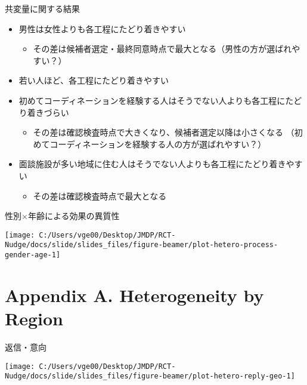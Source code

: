 \documentclass[
      aspectratio=169,
        12pt,
    ]{beamer}
\providecommand{\tightlist}{%
  \setlength{\itemsep}{0pt}\setlength{\parskip}{0pt}}
\begin{document}
\begin{frame}{共変量に関する結果}
\protect\hypertarget{ux5171ux5909ux91cfux306bux95a2ux3059ux308bux7d50ux679c}{}
\begin{itemize}
\tightlist
\item
  男性は女性よりも各工程にたどり着きやすい

  \begin{itemize}
  \tightlist
  \item
    その差は候補者選定・最終同意時点で最大となる（男性の方が選ばれやすい？）
  \end{itemize}
\item
  若い人ほど、各工程にたどり着きやすい
\item
  初めてコーディネーションを経験する人はそうでない人よりも各工程にたどり着きづらい

  \begin{itemize}
  \tightlist
  \item
    その差は確認検査時点で大きくなり、候補者選定以降は小さくなる
    （初めてコーディネーションを経験する人の方が選ばれやすい？）
  \end{itemize}
\item
  面談施設が多い地域に住む人はそうでない人よりも各工程にたどり着きやすい

  \begin{itemize}
  \tightlist
  \item
    その差は確認検査時点で最大となる
  \end{itemize}
\end{itemize}
\end{frame}

\begin{frame}{性別×年齢による効果の異質性}
\protect\hypertarget{ux6027ux5225ux5e74ux9f62ux306bux3088ux308bux52b9ux679cux306eux7570ux8ceaux6027-1}{}
\begin{center}\texttt{[image: C:/Users/vge00/Desktop/JMDP/RCT-Nudge/docs/slide/slides\_files/figure-beamer/plot-hetero-process-gender-age-1]} \end{center}
\end{frame}

\hypertarget{appendix-a.-heterogeneity-by-region}{%
\section{Appendix A. Heterogeneity by Region}\label{appendix-a.-heterogeneity-by-region}}

\begin{frame}{返信・意向}
\protect\hypertarget{ux8fd4ux4fe1ux610fux5411}{}
\begin{center}\texttt{[image: C:/Users/vge00/Desktop/JMDP/RCT-Nudge/docs/slide/slides\_files/figure-beamer/plot-hetero-reply-geo-1]} \end{center}
\end{frame}
\end{document}
